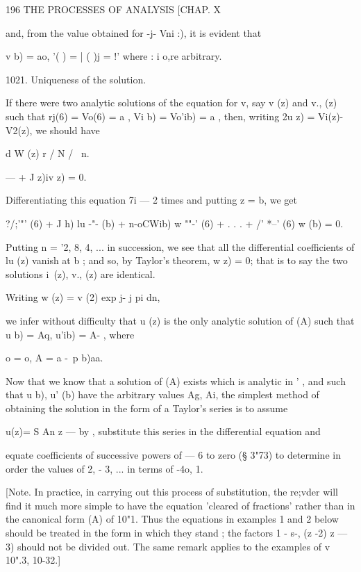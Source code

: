196 THE PROCESSES OF ANALYSIS [CHAP. X 

and, from the value obtained for -j- Vni :), it is evident that 

v b) = ao,  '( ) = | ( )j  = !' 
where   :  i o,re arbitrary. 

1021. Uniqueness of the solution. 

If there were two analytic solutions of the equation for v, say v  (z) and v., (z) 
such that rj(6) = Vo(6) = a , Vi b) = Vo'ib) = a , then, writing 2u z) = Vi(z)-V2(z), 
we should have 

d W (z) r / N / \ n. 

—  + J z)iv z) = 0. 

Differentiating this equation 7i — 2 times and putting z = b, we get 

?/;'"' (6) + J h) lu -"-  (b) + n-oCWib) w ""-'  (6) + . . . + /' *--' (6) w (b) = 0. 

Putting n = '2, 8, 4, ... in succession, we see that all the differential coefficients 
of lu (z) vanish at b ; and so, by Taylor's theorem, w z) = 0; that is to say the 
two solutions i\ (z), v., (z) are identical. 



Writing w (z) = v (2) exp j-   j pi dn, 



we infer without difficulty that u (z) is the only analytic solution of (A) such 
that u b) = Aq, u'ib) = A- , where 

 o =  o, A  = a -\ p b)aa. 

Now that we know that a solution of (A) exists which is analytic in  ' , 
and such that u b), u' (b) have the arbitrary values Ag, Ai, the simplest 
method of obtaining the solution in the form of a Taylor's series is to assume 

u(z)= S An z — by , substitute this series in the differential equation and 

equate coefficients of successive powers of   — 6 to zero (§ 3"73) to determine 
in order the values of  2, - 3, ... in terms of -4o,  1. 

[Note. In practice, in carrying out this process of substitution, the re;vder will find 
it much more simple to have the equation 'cleared of fractions' rather than in the 
canonical form (A) of   10"1. Thus the equations in examples 1 and 2 below should 
be treated in the form in which they stand ; the factors 1 - s-, (z -2)  z — 3) should not be 
divided out. The same remark applies to the examples of  v  10".3, 10-32.] 

